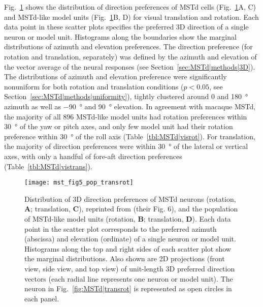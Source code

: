 Fig.~\ref{fig:MSTd|poptransrot} shows the distribution of direction preferences
of \ac{MSTd} cells (Fig.~\ref{fig:MSTd|poptransrot}A, C)
\citep{Gu2006,Takahashi2007} and \ac{MSTd}-like model units 
(Fig.~\ref{fig:MSTd|poptransrot}B, D) for visual translation and rotation. 
Each data point in these scatter plots specifies the preferred 3D direction 
of a single neuron or model unit. Histograms along the boundaries show the 
marginal distributions of azimuth and elevation preferences. The direction
preference (for rotation and translation, separately) was defined by the 
azimuth and elevation of the vector average of the neural responses (see 
Section~\ref{sec:MSTd|methods|3D}). The distributions of azimuth and 
elevation preference were significantly nonuniform for both rotation and
translation conditions ($p<0.05$, see Section~\ref{sec:MSTd|methods|uniformity}),
tightly clustered around $0$ and \SI{180}{\degree} azimuth as well as
\SI{-90}{\degree} and \SI{+90}{\degree} elevation. In agreement with macaque
\ac{MSTd}, the majority of all $896$ \ac{MSTd}-like model units had rotation
preferences within \SI{30}{\degree} of the yaw or pitch axes, and only few 
model unit had their rotation preference within \SI{30}{\degree} of the roll 
axis (Table~\ref{tbl:MSTd|visrot}). 
For translation, the majority of direction preferences were 
within \SI{30}{\degree} of the lateral or vertical axes, with only a handful 
of fore-aft direction preferences (Table~\ref{tbl:MSTd|vistrans}).

\begin{figure}[t]
  \centering
  \texttt{[image: mst\_fig5\_pop\_transrot]}
  \caption{
  Distribution of 3D direction preferences of \ac{MSTd} neurons 
  (rotation, \textbf{A}; translation, \textbf{C}), reprinted from 
  \cite{Takahashi2007} (their Fig. $6$), and the population of 
  \ac{MSTd}-like model units (rotation, \textbf{B}; translation, \textbf{D}). 
  Each data point in the scatter plot corresponds to the preferred azimuth 
  (abscissa) and elevation (ordinate) of a single neuron or model unit. 
  Histograms along the top and right sides of each scatter plot show the 
  marginal distributions. Also shown are 2D projections (front view, side view, 
  and top view) of unit-length 3D preferred direction vectors (each radial 
  line represents one neuron or model unit). 
  The neuron in Fig.~\ref{fig:MSTd|transrot} is represented as open circles 
  in each panel.}
\label{fig:MSTd|poptransrot}
\end{figure}

